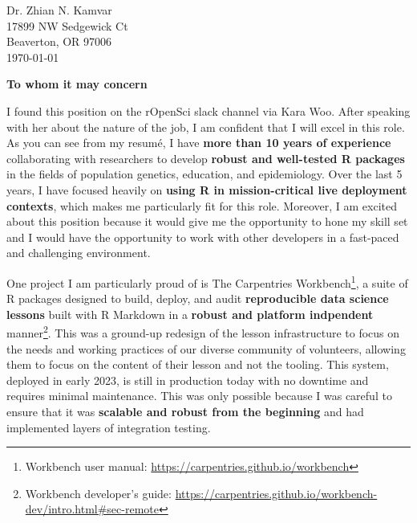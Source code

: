


\clearpage
\begin{flushright}
  Dr. Zhian N. Kamvar\\
  17899 NW Sedgewick Ct\\
  Beaverton, OR 97006\\
  \today
\end{flushright}

\textbf{To whom it may concern}

\vspace{2ex}

I found this position on the rOpenSci slack channel via Kara Woo. After
speaking with her about the nature of the job, I am confident that I will excel
in this role. As you can see from my resum\'{e}, I have \textbf{more than 10
years of experience} collaborating with researchers to develop \textbf{robust
and well-tested R packages} in the fields of population genetics, education,
and epidemiology. Over the last 5 years, I have focused heavily on
\textbf{using R in mission-critical live deployment contexts}, which makes me
particularly fit for this role. Moreover, I am excited about this position
because it would give me the opportunity to hone my skill set and I would have
the opportunity to work with other developers in a fast-paced and challenging
environment.

\vspace{2ex}

One project I am particularly proud of is The Carpentries Workbench\footnote{Workbench user manual: \url{https://carpentries.github.io/workbench}}, 
a suite of R packages designed to build, deploy, and audit \textbf{reproducible
data science lessons} built with R Markdown in a \textbf{robust and platform indpendent} manner\footnote{Workbench developer's guide: \url{https://carpentries.github.io/workbench-dev/intro.html\#sec-remote}}.
This was a ground-up redesign of the lesson infrastructure to focus on
the needs and working practices of our diverse community of volunteers,
allowing them to focus on the content of their lesson and not the tooling.
This system, deployed in early 2023, is still in production today with no
downtime and requires minimal maintenance. This was only possible because I was
careful to ensure that it was \textbf{scalable and robust from the beginning}
and had implemented layers of integration testing.

